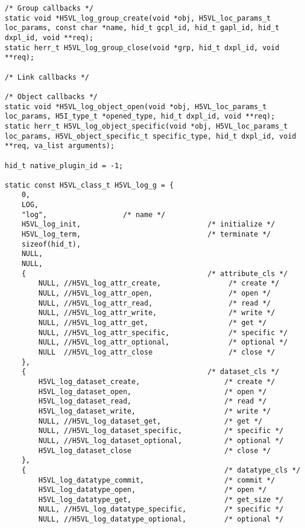\begin{lstlisting}
/* Group callbacks */
static void *H5VL_log_group_create(void *obj, H5VL_loc_params_t loc_params, const char *name, hid_t gcpl_id, hid_t gapl_id, hid_t dxpl_id, void **req);
static herr_t H5VL_log_group_close(void *grp, hid_t dxpl_id, void **req);

/* Link callbacks */

/* Object callbacks */
static void *H5VL_log_object_open(void *obj, H5VL_loc_params_t loc_params, H5I_type_t *opened_type, hid_t dxpl_id, void **req);
static herr_t H5VL_log_object_specific(void *obj, H5VL_loc_params_t loc_params, H5VL_object_specific_t specific_type, hid_t dxpl_id, void **req, va_list arguments);

hid_t native_plugin_id = -1;

static const H5VL_class_t H5VL_log_g = {
    0,
    LOG,
    "log",					/* name */
    H5VL_log_init,                              /* initialize */
    H5VL_log_term,                              /* terminate */
    sizeof(hid_t),
    NULL,
    NULL,
    {                                           /* attribute_cls */
        NULL, //H5VL_log_attr_create,                /* create */
        NULL, //H5VL_log_attr_open,                  /* open */
        NULL, //H5VL_log_attr_read,                  /* read */
        NULL, //H5VL_log_attr_write,                 /* write */
        NULL, //H5VL_log_attr_get,                   /* get */
        NULL, //H5VL_log_attr_specific,              /* specific */
        NULL, //H5VL_log_attr_optional,              /* optional */
        NULL  //H5VL_log_attr_close                  /* close */
    },
    {                                           /* dataset_cls */
        H5VL_log_dataset_create,                    /* create */
        H5VL_log_dataset_open,                      /* open */
        H5VL_log_dataset_read,                      /* read */
        H5VL_log_dataset_write,                     /* write */
        NULL, //H5VL_log_dataset_get,               /* get */
        NULL, //H5VL_log_dataset_specific,          /* specific */
        NULL, //H5VL_log_dataset_optional,          /* optional */
        H5VL_log_dataset_close                      /* close */
    },
    {                                               /* datatype_cls */
        H5VL_log_datatype_commit,                   /* commit */
        H5VL_log_datatype_open,                     /* open */
        H5VL_log_datatype_get,                      /* get_size */
        NULL, //H5VL_log_datatype_specific,         /* specific */
        NULL, //H5VL_log_datatype_optional,         /* optional */

\end{lstlisting}
